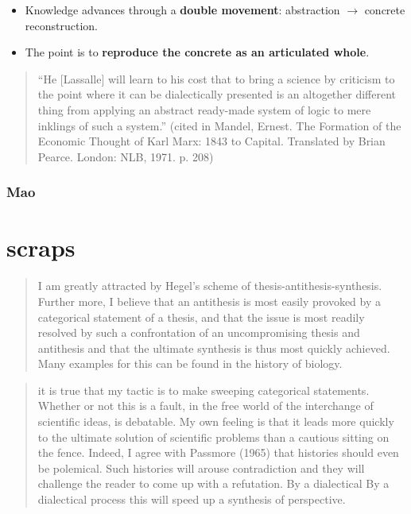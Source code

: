       \begin{itemize}
        \item Knowledge advances through a \textbf{double movement}:
              abstraction $\rightarrow$ concrete reconstruction.
        \item The point is to \textbf{reproduce the concrete as an articulated whole}.
      \end{itemize}



\begin{quote}
``He [Lassalle] will learn to his cost that to bring a science by criticism to the point where it can be dialectically presented is an altogether different thing from applying an abstract ready-made system of logic to mere inklings of such a system.'' (cited in Mandel, Ernest. The Formation of the Economic Thought of Karl Marx: 1843 to Capital. Translated by Brian Pearce. London: NLB, 1971. p. 208)
\end{quote}

\subsubsection{Mao}

\section{scraps}

\begin{quote}
I am greatly attracted by Hegel's scheme of thesis-antithesis-synthesis. Further more, I believe that an antithesis is most easily provoked by a categorical statement of a thesis, and that the issue is most readily resolved by such a confrontation of an uncompromising thesis and antithesis and that the ultimate synthesis is thus most quickly achieved. Many examples for this can be found in the history of biology.
\citep[p. 9]{Mayr1982}
\end{quote}

\begin{quote}
it is true that my tactic is to make sweeping categorical statements. Whether or not this is a fault, in the free world of the interchange of scientific ideas, is debatable. My own feeling is that it leads more quickly to the ultimate solution of scientific problems than a cautious sitting on the fence. Indeed, I agree with Passmore (1965) that histories should even be polemical. Such histories will arouse contradiction and they will challenge the reader to come up with a refutation. By a dialectical By a dialectical process this will speed up a synthesis of perspective.
\citep[p. 9]{Mayr1982}
\end{quote}

